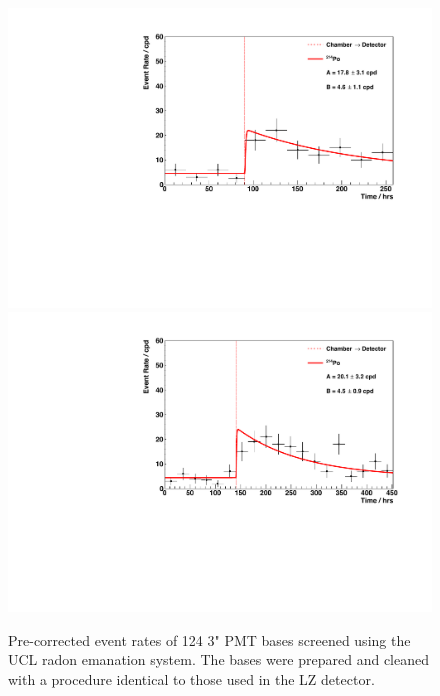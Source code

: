 \begin{figure}[h!]
    \centering
    \includegraphics[scale=0.42]{Chapter_4/Figures/ucl_measurements/3_inch_bases_first_Po214.pdf}
    \includegraphics[scale=0.42]{Chapter_4/Figures/ucl_measurements/3_inch_bases_second_Po214.pdf}
    \caption[Pre-corrected \PoTOF{} event rate results obtained from the two measurements made on the 124 3" PMT bases screened using the UCL radon emanation system. The bases were prepared and cleaned in a procedure identical to those used in the LZ detector.]
    {Pre-corrected \PoTOF{} event rates of 124 3" PMT bases screened using the UCL radon emanation system. The bases were prepared and cleaned with a procedure identical to those used in the LZ detector.}
    \label{fig:3_inch_pmt_base_results}
\end{figure}
%



